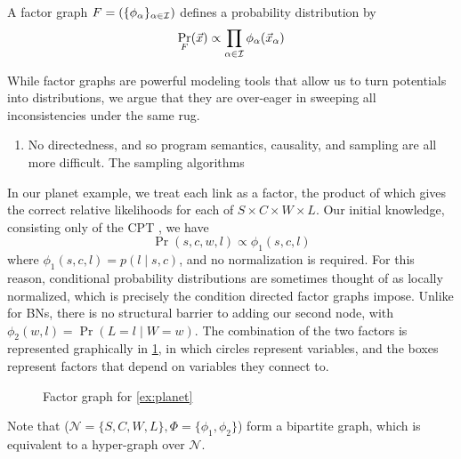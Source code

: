 \documentclass{article}
\newcommand\changed[1]{{\color{note-fg} #1}}
\newcommand\changeoff{\color{black} }
\begin{document}
	A factor graph $F = (\{\phi_\alpha\}_{\alpha \in \cal I})$ defines a probability distribution by 
	\[ \Pr_F(\vec x) \propto \prod_{\alpha \in \cal I} \phi_\alpha(\vec x_{\alpha}) \]

	While factor graphs are powerful modeling tools that allow us to turn potentials into distributions, we argue that they are over-eager in sweeping all inconsistencies under the same rug. 
	\begin{enumerate}
		\item No directedness, and so program semantics, causality, and sampling are all more difficult. The sampling algorithms
	\end{enumerate}
	\changeoff
	
	\begin{example}[continues=ex:planet]
		\changed{In our planet example, we treat each link as a factor, the product of which gives the correct relative likelihoods for each of $S \times C \times W \times L$. Our initial knowledge, consisting only of the CPT , we have 
		\[ \Pr(s, c, w, l) \propto \phi_1(s,c,l)  \]
		where $\phi_1(s,c,l) = p(l \mid s,c)$, and no normalization is required. For this reason, conditional probability distributions are sometimes thought of as locally normalized, which is precisely the condition directed factor graphs \cite{frey} impose. Unlike for BNs, there is no structural barrier to adding our second node, with $\phi_2(w,l) = \Pr(L\!=\!l\mid W\!=\!w)$. The combination of the two factors is represented graphically in \cref{fig:planet-factorgraph}, in which circles represent variables, and the boxes represent factors that depend on variables they connect to. }
		
		\begin{figure}[h]
			\centering
			\caption{Factor graph for \cref{ex:planet}}
			\label{fig:planet-factorgraph}
		\end{figure}
	 	Note that ($\mathcal N \!=\! \{S,C,W,L\}, \Phi \!=\! \{\phi_1,\phi_2\}$) form a bipartite graph, which is equivalent to a hyper-graph over $\mathcal N$. 
	 	
	 	
	
	\end{example}	
	
\end{document}
